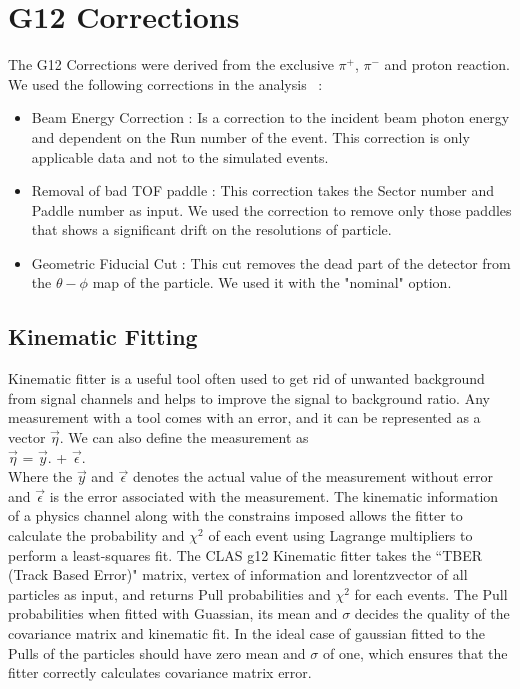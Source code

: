 \documentclass[12pt,a4paper]{amsbook}
\theoremstyle{definition}
\begin{document}
\section{G12 Corrections}
\label{Cor}
The G12 Corrections were derived from the exclusive $\pi^{+}$, $\pi^{-}$ and proton reaction. We used the following corrections in the analysis ~\cite{G12_AN}:
    
\begin {itemize}
\item Beam Energy Correction : Is a correction to the incident beam photon energy and dependent on the Run number of the event. This correction is only applicable data and not to the simulated events.
\item Removal of bad TOF paddle : This correction takes the Sector number and Paddle number as input. We used the correction to remove only those paddles that shows a significant drift on the resolutions of particle.   
\item  Geometric Fiducial Cut : This cut removes the dead part of the detector from the $\theta-\phi$ map of the particle. We used it with the "nominal" option. 
\end {itemize}

\subsection{Kinematic Fitting}
\label{KF}
Kinematic fitter is a useful tool often used to get rid of unwanted background from signal channels and helps to improve the signal to background ratio.  Any measurement with a tool comes with an error, and it can be represented as a vector  $\vec{\eta}$. We can also define the measurement as 
\\ $\vec{\eta}$ =  $\vec{y}$. +  $\vec{\epsilon}$.\\
Where the $\vec{y}$ and $\vec{\epsilon}$ denotes the actual value of the measurement without error and $\vec{\epsilon}$ is the error associated with the measurement. The kinematic information of a physics channel along with the constrains imposed allows the fitter to calculate the probability and $\chi^{2}$ of each event using Lagrange multipliers to perform a least-squares fit. The CLAS g12 Kinematic fitter takes the ``TBER (Track Based Error)" matrix, vertex of information and lorentzvector of all particles as input, and returns Pull probabilities and $\chi^{2}$ for each events. The Pull probabilities when fitted with Guassian, its mean and $\sigma$ decides the quality of the covariance matrix and kinematic fit. In the ideal case of gaussian fitted to the Pulls of the particles should have  zero mean and $\sigma$ of one, which ensures that the fitter correctly calculates covariance matrix error. 
  
\end{document}
